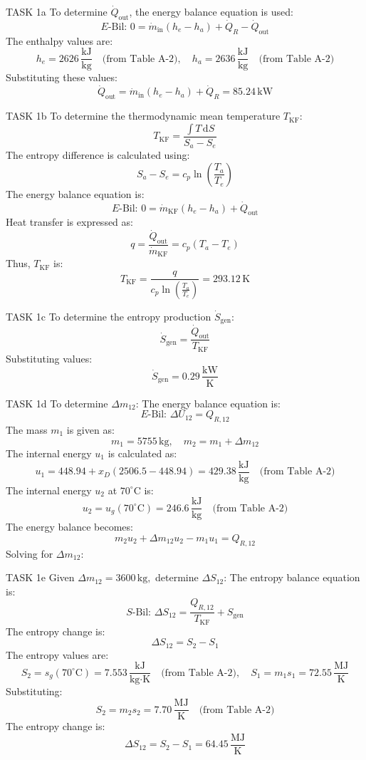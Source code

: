 TASK 1a  
To determine \( \dot{Q}_{\text{out}} \), the energy balance equation is used:  
\[
E\text{-Bil: } 0 = \dot{m}_{\text{in}} (h_e - h_a) + \dot{Q}_R - \dot{Q}_{\text{out}}
\]  
The enthalpy values are:  
\[
h_e = 2626 \, \frac{\text{kJ}}{\text{kg}} \quad \text{(from Table A-2)}, \quad h_a = 2636 \, \frac{\text{kJ}}{\text{kg}} \quad \text{(from Table A-2)}
\]  
Substituting these values:  
\[
\dot{Q}_{\text{out}} = \dot{m}_{\text{in}} (h_e - h_a) + \dot{Q}_R = 85.24 \, \text{kW}
\]  

TASK 1b  
To determine the thermodynamic mean temperature \( T_{\text{KF}} \):  
\[
T_{\text{KF}} = \frac{\int T \, \text{d}S}{S_a - S_e}
\]  
The entropy difference is calculated using:  
\[
S_a - S_e = c_p \ln\left(\frac{T_a}{T_e}\right)
\]  
The energy balance equation is:  
\[
E\text{-Bil: } 0 = \dot{m}_{\text{KF}} (h_e - h_a) + \dot{Q}_{\text{out}}
\]  
Heat transfer is expressed as:  
\[
q = \frac{\dot{Q}_{\text{out}}}{\dot{m}_{\text{KF}}} = c_p (T_a - T_e)
\]  
Thus, \( T_{\text{KF}} \) is:  
\[
T_{\text{KF}} = \frac{q}{c_p \ln\left(\frac{T_a}{T_e}\right)} = 293.12 \, \text{K}
\]  

TASK 1c  
To determine the entropy production \( \dot{S}_{\text{gen}} \):  
\[
\dot{S}_{\text{gen}} = \frac{\dot{Q}_{\text{out}}}{T_{\text{KF}}}
\]  
Substituting values:  
\[
\dot{S}_{\text{gen}} = 0.29 \, \frac{\text{kW}}{\text{K}}
\]  

TASK 1d  
To determine \( \Delta m_{12} \):  
The energy balance equation is:  
\[
E\text{-Bil: } \Delta U_{12} = Q_{R,12}
\]  
The mass \( m_1 \) is given as:  
\[
m_1 = 5755 \, \text{kg}, \quad m_2 = m_1 + \Delta m_{12}
\]  
The internal energy \( u_1 \) is calculated as:  
\[
u_1 = 448.94 + x_D (2506.5 - 448.94) = 429.38 \, \frac{\text{kJ}}{\text{kg}} \quad \text{(from Table A-2)}
\]  
The internal energy \( u_2 \) at \( 70^\circ\text{C} \) is:  
\[
u_2 = u_g(70^\circ\text{C}) = 246.6 \, \frac{\text{kJ}}{\text{kg}} \quad \text{(from Table A-2)}
\]  
The energy balance becomes:  
\[
m_2 u_2 + \Delta m_{12} u_2 - m_1 u_1 = Q_{R,12}
\]  
Solving for \( \Delta m_{12} \):  

TASK 1e  
Given \( \Delta m_{12} = 3600 \, \text{kg}, \) determine \( \Delta S_{12} \):  
The entropy balance equation is:  
\[
S\text{-Bil: } \Delta S_{12} = \frac{Q_{R,12}}{T_{\text{KF}}} + S_{\text{gen}}
\]  
The entropy change is:  
\[
\Delta S_{12} = S_2 - S_1
\]  
The entropy values are:  
\[
S_2 = s_g(70^\circ\text{C}) = 7.553 \, \frac{\text{kJ}}{\text{kg·K}} \quad \text{(from Table A-2)}, \quad S_1 = m_1 s_1 = 72.55 \, \frac{\text{MJ}}{\text{K}}
\]  
Substituting:  
\[
S_2 = m_2 s_2 = 7.70 \, \frac{\text{MJ}}{\text{K}} \quad \text{(from Table A-2)}
\]  
The entropy change is:  
\[
\Delta S_{12} = S_2 - S_1 = 64.45 \, \frac{\text{MJ}}{\text{K}}
\]